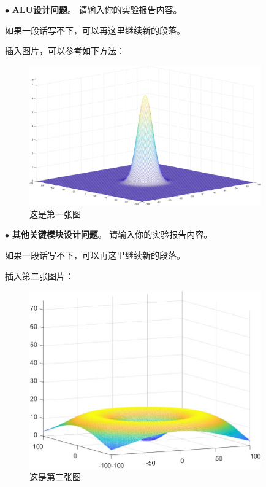 \documentclass[11pt]{article}
\begin{document}
\noindent
$\bullet$
\textbf{ALU设计问题}。
请输入你的实验报告内容。

如果一段话写不下，可以再这里继续新的段落。

插入图片，可以参考如下方法：
\begin{figure}[h]
  \centering
  \includegraphics[width=10cm]{fig/Gaussian.pdf}
  \caption{这是第一张图}
\end{figure}

\vspace{1ex}

\noindent
$\bullet$
\textbf{其他关键模块设计问题}。
请输入你的实验报告内容。

如果一段话写不下，可以再这里继续新的段落。

插入第二张图片：
\begin{figure}[h]
  \centering
  \includegraphics[width=10cm]{fig/Maxwell.pdf}
  \caption{这是第二张图}
\end{figure}
\end{document}
